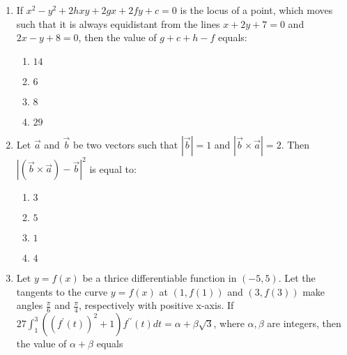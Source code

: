 \documentclass[journal]{IEEEtran}
\newcommand{\brak}[1]{\left( #1 \right)}
\newcommand{\abs}[1]{\left| #1 \right|}
\begin{document}
\begin{enumerate}
        \begin{multicols}{4}
        \begin{enumerate}
        \item $20$
        \item $25$
        \item $21$
        \item $24$
        \end{enumerate}
        \end{multicols}

    \item If $x^{2}-y^{2}+2hxy+2gx+2fy+c=0$ is the locus of a point, which moves such that it is always equidistant from the lines $x+2y+7=0$ and $2x-y+8=0$, then the value of $g+c+h-f$ equals:

        \begin{multicols}{4}
        \begin{enumerate}
        \item $14$
        \item $6$
        \item $8$
        \item $29$
        \end{enumerate}
        \end{multicols}

    \item Let $\vec{a}$ and $\vec{b}$ be two vectors such that $\abs{\vec{b}}=1$ and $\abs{\vec{b}\times\vec{a}}=2$. Then $\abs{\brak{\vec{b}\times\vec{a}}-\vec{b}}^{2}$ is equal to:

        \begin{multicols}{4}
        \begin{enumerate}
        \item $3$
        \item $5$
        \item $1$
        \item $4$
        \end{enumerate}
        \end{multicols}

    \item Let $y=f\brak{x}$ be a thrice differentiable function in $\brak{-5,5}$. Let the tangents to the curve $y=f\brak{x}$ at $\brak{1,f\brak{1}}$ and $\brak{3,f\brak{3}}$ make angles $\frac{\pi}{6}$ and $\frac{\pi}{4}$, respectively with positive x-axis. If $27\int_{1}^{3}\brak{\brak{f^{\prime}\brak{t}}^{2}+1}f^{\prime\prime}\brak{t}dt=\alpha+\beta\sqrt{3}$, where $\alpha,\beta$ are integers, then the value of $\alpha+\beta$ equals


\end{enumerate}
\end{document}
